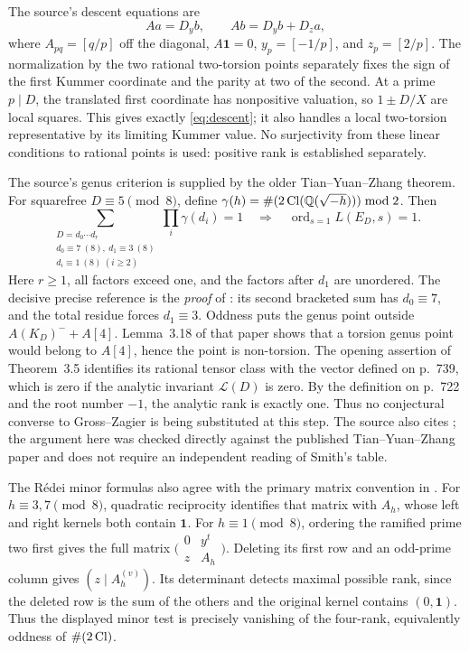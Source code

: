 \documentclass[11pt,a4paper]{article}
\theoremstyle{remark}\newtheorem{remark}[theorem]{Remark}
\newcommand{\Q}{\mathbb Q}\newcommand{\Z}{\mathbb Z}\newcommand{\F}{\mathbb F}
\begin{document}
The source's descent equations are
\begin{equation}\label{eq:descent}
 Aa=D_yb,\qquad Ab=D_yb+D_za,
\end{equation}
where $A_{pq}=[q/p]$ off the diagonal, $A\mathbf1=0$,
$y_p=[-1/p]$, and $z_p=[2/p]$. The normalization by the two
rational two-torsion points separately fixes the sign of the first
Kummer coordinate and the parity at two of the second. At a prime
$p\mid D$, the translated first coordinate has nonpositive valuation,
so $1\pm D/X$ are local squares. This gives exactly
\eqref{eq:descent}; it also handles a local two-torsion representative
by its limiting Kummer value. No surjectivity from these linear
conditions to rational points is used: positive rank is established
separately.

The source's genus criterion is supplied by the older
Tian--Yuan--Zhang theorem. For squarefree $D\equiv5\pmod8$, define
$\gamma(h)=\#(2\Cl(\Q(\sqrt{-h})))\bmod2$. Then
\begin{equation}\label{eq:genus}
 \sum_{\substack{D=d_0\cdots d_r\\
 d_0\equiv7\ (8),\ d_1\equiv3\ (8)\\
 d_i\equiv1\ (8)\ (i\ge2)}}\prod_i\gamma(d_i)=1
 \quad\Longrightarrow\quad
 \operatorname{ord}_{s=1}L(E_D,s)=1.
\end{equation}
Here $r\ge1$, all factors exceed one, and the factors after $d_1$
are unordered. The decisive precise reference is the \emph{proof}
of \cite[Theorem~3.5(2), p.~760]{TYZ}: its second bracketed sum has
$d_0\equiv7$, and the total residue forces $d_1\equiv3$.
Oddness puts the genus point outside $A(K_D)^-+A[4]$.
Lemma~3.18 of that paper shows that a torsion genus point would
belong to $A[4]$, hence the point is non-torsion. The opening
assertion of Theorem~3.5 identifies its rational tensor class with
the vector defined on p.~739, which is zero if the analytic invariant
$\mathcal L(D)$ is zero. By the definition on p.~722 and the root
number $-1$, the analytic rank is exactly one. Thus no conjectural
converse to Gross--Zagier is being substituted at this step.
The source also cites \cite[Theorem~2.1, Table~2, row~5(b)]{Smith};
the argument here was checked directly against the published
Tian--Yuan--Zhang paper and does not require an independent reading
of Smith's table.


The R\'edei minor formulas also agree with the primary matrix convention
in \cite[Theorem~3.1 and (16)]{Stevenhagen}. For $h\equiv3,7\pmod8$,
quadratic reciprocity identifies that matrix with $A_h$, whose left and
right kernels both contain $\mathbf1$. For $h\equiv1\pmod8$, ordering
the ramified prime two first gives the full matrix
$\bigl(\begin{smallmatrix}0&y^t\\z&A_h\end{smallmatrix}\bigr)$.
Deleting its first row and an odd-prime column gives
$(z\mid A_h^{(v)})$. Its determinant detects maximal possible rank,
since the deleted row is the sum of the others and the original kernel
contains $(0,\mathbf1)$. Thus the displayed minor test is precisely
vanishing of the four-rank, equivalently oddness of $\#(2\operatorname{Cl})$.
\end{document}
